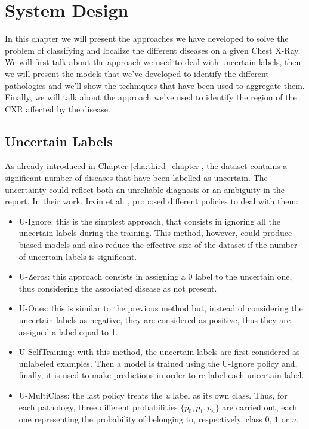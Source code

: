 \chapter{System Design}
\label{cha:fourth_chapter}

In this chapter we will present the approaches we have developed to solve the problem of classifying and localize the different diseases on a given Chest X-Ray. We will first talk about the approach we used to deal with uncertain labels, then we will present the models that we've developed to identify the different pathologies and we'll show the techniques that have been used to aggregate them. Finally, we will talk about the approach we've used to identify the region of the CXR affected by the disease. 


\section{Uncertain Labels}
\label{sec:uncertainty}
As already introduced in Chapter \ref{cha:third_chapter}, the dataset contains a significant number of diseases that have been labelled as uncertain. The uncertainty could reflect both an unreliable diagnosis or an ambiguity in the report. In their work, Irvin et al. \cite{irvin2019chexpert}, proposed different policies to deal with them:
\begin{itemize}
    \item U-Ignore: this is the simplest approach, that consists in ignoring all the uncertain labels during the training. This method, however, could produce biased models and also reduce the effective size of the dataset if the number of uncertain labels is significant.
    \item U-Zeros: this approach consists in assigning a 0 label to the uncertain one, thus considering the associated disease as not present.
    \item U-Ones: this is similar to the previous method but, instead of considering the uncertain labels as negative, they are considered as positive, thus they are assigned a label equal to 1.
    \item U-SelfTraining: with this method, the uncertain labels are first considered as unlabeled examples. Then a model is  trained using the U-Ignore policy and, finally, it is used to make predictions in order to re-label each uncertain label.
    \item U-MultiClass: the last policy treats the \textit{u} label as its own class. Thus, for each pathology, three different probabilities $\{p_{0} , p_{1},p_{u}\}$ are carried out, each one representing the probability of belonging to, respectively, class $0$, $1$ or $u$.
\end{itemize}

